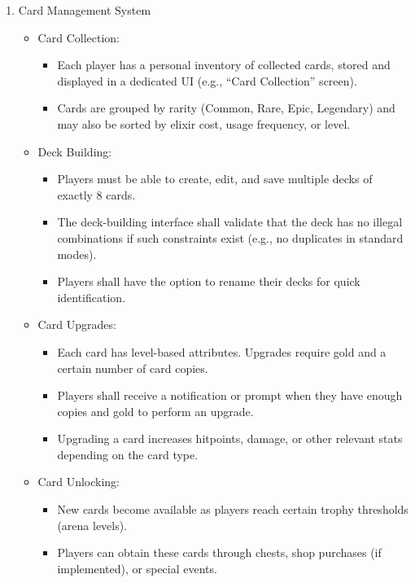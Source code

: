 \documentclass{article}
\begin{document}
\begin{enumerate}[label=\textbf{FR\arabic*:}]
    \item Card Management System
    \begin{itemize}
        \item Card Collection:
        \begin{itemize}
            \item Each player has a personal inventory of collected cards, stored and displayed in a dedicated UI (e.g., ``Card Collection'' screen).
            \item Cards are grouped by rarity (Common, Rare, Epic, Legendary) and may also be sorted by elixir cost, usage frequency, or level.
        \end{itemize}
        \item Deck Building:
        \begin{itemize}
            \item Players must be able to create, edit, and save multiple decks of exactly 8 cards.
            \item The deck-building interface shall validate that the deck has no illegal combinations if such constraints exist (e.g., no duplicates in standard modes).
            \item Players shall have the option to rename their decks for quick identification.
        \end{itemize}
        \item Card Upgrades:
        \begin{itemize}
            \item Each card has level-based attributes. Upgrades require gold and a certain number of card copies.
            \item Players shall receive a notification or prompt when they have enough copies and gold to perform an upgrade.
            \item Upgrading a card increases hitpoints, damage, or other relevant stats depending on the card type.
        \end{itemize}
        \item Card Unlocking:
        \begin{itemize}
            \item New cards become available as players reach certain trophy thresholds (arena levels).
            \item Players can obtain these cards through chests, shop purchases (if implemented), or special events.
        \end{itemize}
    \end{itemize}
    

\end{enumerate}
\end{document}
